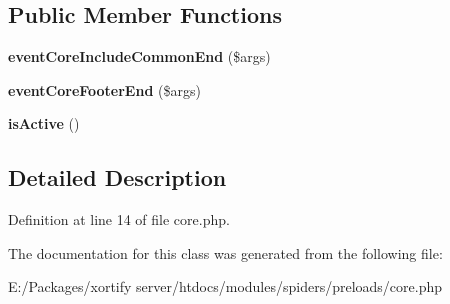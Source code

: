 \subsection*{Public Member Functions}
\begin{DoxyCompactItemize}
\item 
\hypertarget{class_spiders_core_preload_af8c197de09add249b14503f6a03434d1}{{\bfseries event\-Core\-Include\-Common\-End} (\$args)}\label{class_spiders_core_preload_af8c197de09add249b14503f6a03434d1}

\item 
\hypertarget{class_spiders_core_preload_a87b15888767bafa70ea17f96bf176c87}{{\bfseries event\-Core\-Footer\-End} (\$args)}\label{class_spiders_core_preload_a87b15888767bafa70ea17f96bf176c87}

\item 
\hypertarget{class_spiders_core_preload_aa56a17bc66c1081fad1cca3a488224c3}{{\bfseries is\-Active} ()}\label{class_spiders_core_preload_aa56a17bc66c1081fad1cca3a488224c3}

\end{DoxyCompactItemize}


\subsection{Detailed Description}


Definition at line 14 of file core.\-php.



The documentation for this class was generated from the following file\-:\begin{DoxyCompactItemize}
\item 
E\-:/\-Packages/xortify server/htdocs/modules/spiders/preloads/core.\-php\end{DoxyCompactItemize}
